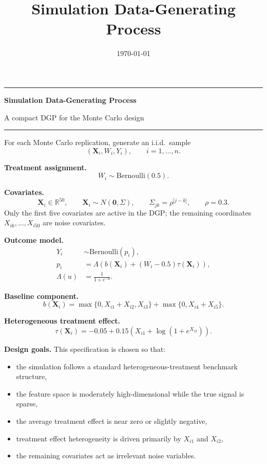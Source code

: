 \documentclass[12pt]{article}
\title{Simulation Data-Generating Process}
\date{\today}
\begin{document}
\thispagestyle{empty}

{\color{titleblue}\rule{\textwidth}{1.2pt}}

\begin{center}
    {\LARGE\bfseries\color{titleblue} Simulation Data-Generating Process}

    \vspace{0.35em}
    {\normalsize A compact DGP for the Monte Carlo design}
\end{center}

{\color{lineblue}\rule{\textwidth}{0.8pt}}

\begin{tcolorbox}[
    colback=softblue,
    colframe=lineblue,
    boxrule=0.7pt,
    arc=2pt,
    left=10pt,right=10pt,top=8pt,bottom=8pt
]
For each Monte Carlo replication, generate an i.i.d.\ sample
\[
(\bm{X}_i, W_i, Y_i), \qquad i=1,\dots,n.
\]
\end{tcolorbox}

\textbf{Treatment assignment.}
\[
W_i \sim \mathrm{Bernoulli}(0.5).
\]

\textbf{Covariates.}
\[
\bm{X}_i \in \mathbb{R}^{50},
\qquad
\bm{X}_i \sim N(\bm{0}, \Sigma),
\qquad
\Sigma_{jk} = \rho^{|j-k|},
\qquad
\rho = 0.3.
\]
Only the first five covariates are active in the DGP; the remaining coordinates
$X_{i6},\dots,X_{i50}$ are noise covariates.

\textbf{Outcome model.}
\begin{align*}
Y_i &\sim \mathrm{Bernoulli}(p_i), \\
p_i &= \Lambda\!\left(b(\bm{X}_i) + (W_i-0.5)\tau(\bm{X}_i)\right), \\
\Lambda(u) &= \frac{1}{1+e^{-u}}.
\end{align*}

\textbf{Baseline component.}
\[
b(\bm{X}_i)
=
\max\{0, X_{i1}+X_{i2}, X_{i3}\}
+\max\{0, X_{i4}+X_{i5}\}.
\]

\textbf{Heterogeneous treatment effect.}
\[
\tau(\bm{X}_i)
=
-0.05
+0.15\left(X_{i1}+\log\!\left(1+e^{X_{i2}}\right)\right).
\]

\textbf{Design goals.} This specification is chosen so that:
\begin{itemize}
    \item the simulation follows a standard heterogeneous-treatment benchmark structure,
    \item the feature space is moderately high-dimensional while the true signal is sparse,
    \item the average treatment effect is near zero or slightly negative,
    \item treatment effect heterogeneity is driven primarily by $X_{i1}$ and $X_{i2}$,
    \item the remaining covariates act as irrelevant noise variables.
\end{itemize}
\end{document}

